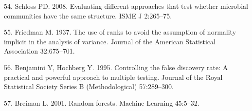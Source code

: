 \documentclass[11pt,]{article}
\begin{document}
\hypertarget{ref-schloss_commstruct_2008}{}
54. Schloss PD. 2008. Evaluating different approaches that test whether
microbial communities have the same structure. ISME J 2:265--75.

\hypertarget{ref-friedman_1937}{}
55. Friedman M. 1937. The use of ranks to avoid the assumption of
normality implicit in the analysis of variance. Journal of the American
Statistical Association 32:675--701.

\hypertarget{ref-Benjamini_Hochberg_1995}{}
56. Benjamini Y, Hochberg Y. 1995. Controlling the false discovery rate:
A practical and powerful approach to multiple testing. Journal of the
Royal Statistical Society Series B (Methodological) 57:289--300.

\hypertarget{ref-breiman_rf_2001}{}
57. Breiman L. 2001. Random forests. Machine Learning 45:5--32.
\end{document}

